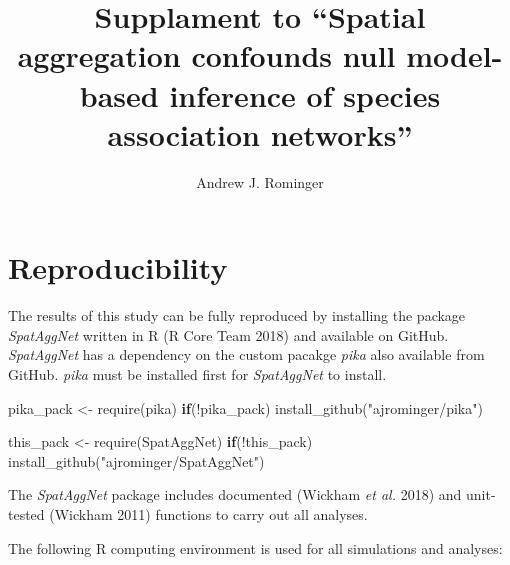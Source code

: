 \documentclass[
  letterpaper,
  DIV=11,
  numbers=noendperiod]{scrartcl}
\title{Supplament to ``Spatial aggregation confounds null model-based
inference of species association networks''}
\author{Andrew J. Rominger}
\date{}
\newenvironment{Shaded}{\begin{snugshade}}{\end{snugshade}}
\newcommand{\ControlFlowTok}[1]{\textcolor[rgb]{0.00,0.23,0.31}{\textbf{#1}}}
\newcommand{\FunctionTok}[1]{\textcolor[rgb]{0.28,0.35,0.67}{#1}}
\newcommand{\NormalTok}[1]{\textcolor[rgb]{0.00,0.23,0.31}{#1}}
\newcommand{\OtherTok}[1]{\textcolor[rgb]{0.00,0.23,0.31}{#1}}
\newcommand{\SpecialCharTok}[1]{\textcolor[rgb]{0.37,0.37,0.37}{#1}}
\newcommand{\StringTok}[1]{\textcolor[rgb]{0.13,0.47,0.30}{#1}}
\begin{document}
\maketitle


\section{Reproducibility}\label{reproducibility}

The results of this study can be fully reproduced by installing the
package \emph{SpatAggNet} written in R (R Core Team 2018) and available
on GitHub. \emph{SpatAggNet} has a dependency on the custom pacakge
\emph{pika} also available from GitHub. \emph{pika} must be installed
first for \emph{SpatAggNet} to install.

\begin{Shaded}
\begin{Highlighting}[]
\NormalTok{pika\_pack }\OtherTok{\textless{}{-}} \FunctionTok{require}\NormalTok{(pika)}
\ControlFlowTok{if}\NormalTok{(}\SpecialCharTok{!}\NormalTok{pika\_pack) }\FunctionTok{install\_github}\NormalTok{(}\StringTok{"ajrominger/pika"}\NormalTok{)}

\NormalTok{this\_pack }\OtherTok{\textless{}{-}} \FunctionTok{require}\NormalTok{(SpatAggNet)}
\ControlFlowTok{if}\NormalTok{(}\SpecialCharTok{!}\NormalTok{this\_pack) }\FunctionTok{install\_github}\NormalTok{(}\StringTok{"ajrominger/SpatAggNet"}\NormalTok{)}
\end{Highlighting}
\end{Shaded}

The \emph{SpatAggNet} package includes documented (Wickham \emph{et al.}
2018) and unit-tested (Wickham 2011) functions to carry out all
analyses.

The following R computing environment is used for all simulations and
analyses:
\end{document}
